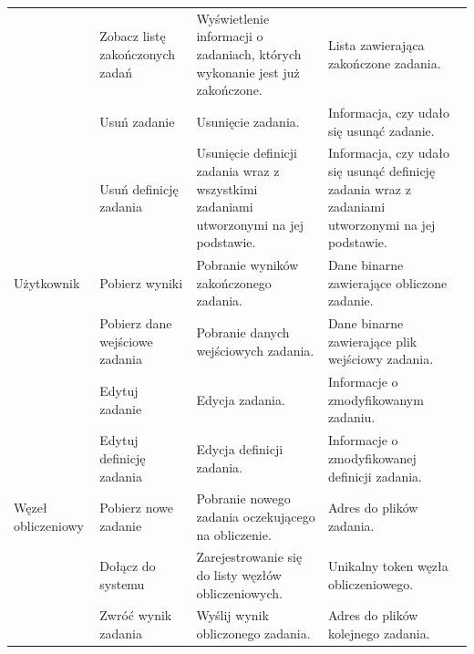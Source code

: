 \documentclass[a4paper,11pt,twoside]{report}
\theoremstyle{definition}
\begin{document}
\begin{longtable}{| p{} | p{} | p{} | p{} |}
                & Zobacz listę zakończonych zadań  
                & Wyświetlenie informacji o zadaniach, których wykonanie jest już zakończone.
                & Lista zawierająca zakończone zadania. \\ \cline{2-4} 
                
                & Usuń zadanie
                & Usunięcie zadania.
                & Informacja, czy udało się usunąć zadanie. \\ \cline{2-4} 
                
                & Usuń definicję zadania
                & Usunięcie definicji zadania wraz z wszystkimi zadaniami utworzonymi na jej podstawie.
                & Informacja, czy udało się usunąć definicję zadania wraz z zadaniami utworzonymi na jej podstawie. \\ \cline{1-4} 
                
                Użytkownik
                & Pobierz wyniki
                & Pobranie wyników zakończonego zadania.
                & Dane binarne zawierające obliczone zadanie. \\ \cline{2-4} 
                
                & Pobierz dane wejściowe zadania
                & Pobranie danych wejściowych zadania.
                & Dane binarne zawierające plik wejściowy zadania. \\ \cline{2-4} 
                
                & Edytuj zadanie                 
                & Edycja zadania.
                & Informacje o  zmodyfikowanym zadaniu. \\ \cline{2-4} 
                
                & Edytuj definicję zadania
                & Edycja definicji zadania.
                & Informacje o zmodyfikowanej definicji zadania. \\ \hline
                
                Węzeł obliczeniowy
                & Pobierz nowe zadanie
                & Pobranie nowego zadania oczekującego na obliczenie.
                & Adres do plików zadania. \\ \cline{2-4} 
                
                & Dołącz do systemu
                & Zarejestrowanie się do listy węzłów obliczeniowych.
                & Unikalny token węzła obliczeniowego. \\ \cline{2-4} 
                
                & Zwróć wynik zadania
                & Wyślij wynik obliczonego zadania.
                & Adres do plików kolejnego zadania. \\ \hline
                
            \end{longtable}
                        
\end{document}
